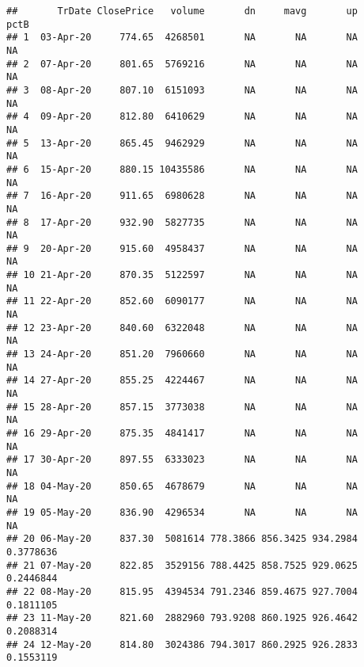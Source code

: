 \documentclass[
]{article}
\begin{document}
\begin{verbatim}
##       TrDate ClosePrice   volume       dn     mavg       up      pctB
## 1  03-Apr-20     774.65  4268501       NA       NA       NA        NA
## 2  07-Apr-20     801.65  5769216       NA       NA       NA        NA
## 3  08-Apr-20     807.10  6151093       NA       NA       NA        NA
## 4  09-Apr-20     812.80  6410629       NA       NA       NA        NA
## 5  13-Apr-20     865.45  9462929       NA       NA       NA        NA
## 6  15-Apr-20     880.15 10435586       NA       NA       NA        NA
## 7  16-Apr-20     911.65  6980628       NA       NA       NA        NA
## 8  17-Apr-20     932.90  5827735       NA       NA       NA        NA
## 9  20-Apr-20     915.60  4958437       NA       NA       NA        NA
## 10 21-Apr-20     870.35  5122597       NA       NA       NA        NA
## 11 22-Apr-20     852.60  6090177       NA       NA       NA        NA
## 12 23-Apr-20     840.60  6322048       NA       NA       NA        NA
## 13 24-Apr-20     851.20  7960660       NA       NA       NA        NA
## 14 27-Apr-20     855.25  4224467       NA       NA       NA        NA
## 15 28-Apr-20     857.15  3773038       NA       NA       NA        NA
## 16 29-Apr-20     875.35  4841417       NA       NA       NA        NA
## 17 30-Apr-20     897.55  6333023       NA       NA       NA        NA
## 18 04-May-20     850.65  4678679       NA       NA       NA        NA
## 19 05-May-20     836.90  4296534       NA       NA       NA        NA
## 20 06-May-20     837.30  5081614 778.3866 856.3425 934.2984 0.3778636
## 21 07-May-20     822.85  3529156 788.4425 858.7525 929.0625 0.2446844
## 22 08-May-20     815.95  4394534 791.2346 859.4675 927.7004 0.1811105
## 23 11-May-20     821.60  2882960 793.9208 860.1925 926.4642 0.2088314
## 24 12-May-20     814.80  3024386 794.3017 860.2925 926.2833 0.1553119
\end{verbatim}
\end{document}
